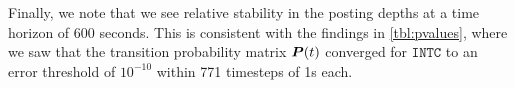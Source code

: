 Finally, we note that we see relative stability in the posting depths at a time horizon of 600 seconds. This is consistent with the findings in \autoref{tbl:pvalues}, where we saw that the transition probability matrix $\boldsymbol{P}(t)$ converged for $\texttt{INTC}$ to an error threshold of $10^{-10}$ within 771 timesteps of 1s each.

%  
%   
%   
%   
%
%
%
%   
